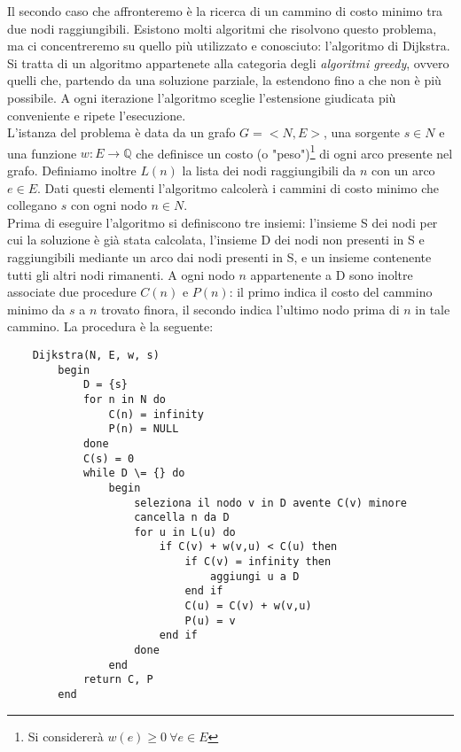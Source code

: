Il secondo caso che affronteremo è la ricerca di un cammino di costo minimo tra due nodi raggiungibili. Esistono molti algoritmi che risolvono questo problema, ma ci concentreremo su quello più utilizzato e conosciuto: l'algoritmo di Dijkstra. Si tratta di un algoritmo appartenete alla categoria degli \textit{algoritmi greedy}, ovvero quelli che, partendo da una soluzione parziale, la estendono fino a che non è più possibile. A ogni iterazione l'algoritmo sceglie l'estensione giudicata più conveniente e ripete l'esecuzione.\\
L'istanza del problema è data da un grafo $G = <N,E>$, una sorgente $s \in N$ e una funzione $w: E \rightarrow \mathbb{Q}$ che definisce un costo (o "peso")\footnote{Si considererà $w(e) \geq 0 \ \forall e \in E$} di ogni arco presente nel grafo. Definiamo inoltre $L(n)$ la lista dei nodi raggiungibili da $n$ con un arco $e \in E$. Dati questi elementi l'algoritmo calcolerà i cammini di costo minimo che collegano $s$ con ogni nodo $n \in N$.\\
Prima di eseguire l'algoritmo si definiscono tre insiemi: l'insieme S dei nodi per cui la soluzione è già stata calcolata, l'insieme D dei nodi non presenti in S e raggiungibili mediante un arco dai nodi presenti in S, e un insieme contenente tutti gli altri nodi rimanenti. A ogni nodo $n$ appartenente a D sono inoltre associate due procedure $C(n)$ e $P(n)$: il primo indica il costo del cammino minimo da $s$ a $n$ trovato finora, il secondo indica l'ultimo nodo prima di $n$ in tale cammino.
\newpage
La procedura è la seguente:
\begin{verbatim}
    Dijkstra(N, E, w, s)
        begin
            D = {s}
            for n in N do
                C(n) = infinity
                P(n) = NULL
            done
            C(s) = 0
            while D \= {} do
                begin
                    seleziona il nodo v in D avente C(v) minore
                    cancella n da D
                    for u in L(u) do
                        if C(v) + w(v,u) < C(u) then
                            if C(v) = infinity then
                                aggiungi u a D
                            end if
                            C(u) = C(v) + w(v,u)
                            P(u) = v
                        end if
                    done
                end
            return C, P
        end
\end{verbatim}
